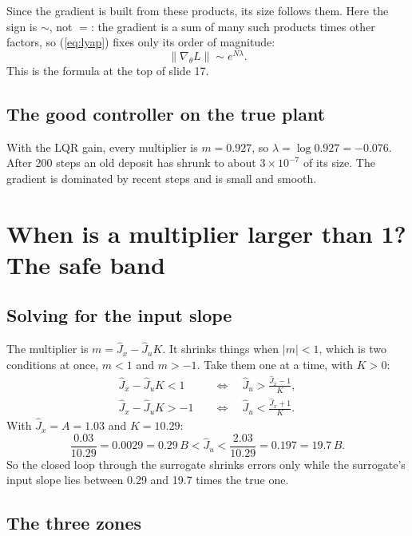 \documentclass[11pt]{article}
\begin{document}
Since the gradient is built from these products, its size follows them. Here the sign is $\sim$, not $=$: the gradient is a sum of many such products times other factors, so (\ref{eq:lyap}) fixes only its order of magnitude:
\begin{equation}
\|\nabla_\theta L\|\sim e^{N\lambda}.
\end{equation}
This is the formula at the top of slide 17.

\subsection{The good controller on the true plant}

With the LQR gain, every multiplier is $m=0.927$, so $\lambda=\log0.927=-0.076$. After 200 steps an old deposit has shrunk to about $3\times10^{-7}$ of its size. The gradient is dominated by recent steps and is small and smooth.

\section{When is a multiplier larger than 1? The safe band}

\subsection{Solving for the input slope}

The multiplier is $m=\hat J_x-\hat J_u K$. It shrinks things when $|m|<1$, which is two conditions at once, $m<1$ and $m>-1$. Take them one at a time, with $K>0$:
\begin{align}
\hat J_x-\hat J_uK<1\quad&\Longleftrightarrow\quad \hat J_u>\frac{\hat J_x-1}{K},\\
\hat J_x-\hat J_uK>-1\quad&\Longleftrightarrow\quad \hat J_u<\frac{\hat J_x+1}{K}.
\end{align}
With $\hat J_x=A=1.03$ and $K=10.29$:
\begin{equation}
\frac{0.03}{10.29}=0.0029=0.29\,B<\hat J_u<\frac{2.03}{10.29}=0.197=19.7\,B .
\end{equation}
So the closed loop through the surrogate shrinks errors only while the surrogate's input slope lies between 0.29 and 19.7 times the true one.

\subsection{The three zones}
\end{document}
